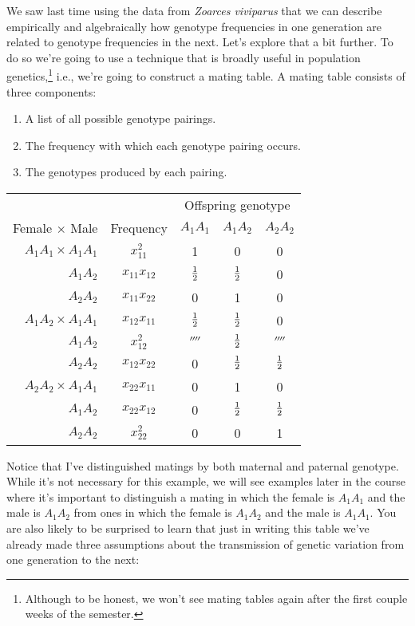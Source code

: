 We saw last time using the data from {\it Zoarces viviparus\/} that we
can describe empirically and algebraically how genotype frequencies in
one generation are related to genotype frequencies in the next. Let's
explore that a bit further. To do so we're going to use a technique
that is broadly useful in population genetics,\footnote{Although to be
  honest, we won't see mating tables again after the first couple
  weeks of the semester.} i.e., we're going to
construct a mating table. A mating table consists of three
components:

\begin{enumerate}

\item A list of all possible genotype pairings.

\item The frequency with which each genotype pairing occurs.

\item The genotypes produced by each pairing.

\end{enumerate}

\begin{center}
\begin{tabular}{rcccc}
\hline\hline
                       &           & \multicolumn{3}{c}{Offspring genotype} \\
Female $\times$ Male   & Frequency     & $A_1A_1$ & $A_1A_2$ & $A_2A_2$ \\
\hline
$A_1A_1 \times A_1A_1$ & $x_{11}^2$     &        1 &        0 &        0 \\
              $A_1A_2$ & $x_{11}x_{12}$ &    $\frac{1}{2}$ &    $\frac{1}{2}$ &        0 \\
              $A_2A_2$ & $x_{11}x_{22}$ &        0 &        1 &        0 \\
$A_1A_2 \times A_1A_1$ & $x_{12}x_{11}$ &    $\frac{1}{2}$ &    $\frac{1}{2}$ &        0 \\
              $A_1A_2$ & $x_{12}^2$     &  $\fourth$ &    $\frac{1}{2}$ &  $\fourth$ \\
              $A_2A_2$ & $x_{12}x_{22}$ &        0 &    $\frac{1}{2}$ &    $\frac{1}{2}$ \\
$A_2A_2 \times A_1A_1$ & $x_{22}x_{11}$ &        0 &        1 &        0 \\
              $A_1A_2$ & $x_{22}x_{12}$ &        0 &    $\frac{1}{2}$ &    $\frac{1}{2}$ \\
              $A_2A_2$ & $x_{22}^2$     &        0 &         0 &
                       1 \\
\hline
\end{tabular}
\end{center}
Notice that I've distinguished matings by both maternal and paternal
genotype. While it's not necessary for this example, we will see
examples later in the course where it's important to distinguish a
mating in which the female is $A_1A_1$ and the male is $A_1A_2$ from
ones in which the female is $A_1A_2$ and the male is $A_1A_1$. You are
also likely to be surprised to learn that just in writing this table
we've already made three assumptions about the transmission of genetic
variation from one generation to the next:

